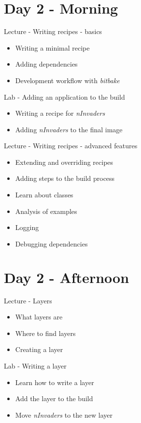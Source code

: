 \documentclass[a4paper,12pt,obeyspaces,spaces,hyphens]{article}
\begin{document}
\section{Day 2 - Morning}

\feagendatwocolumn
{Lecture - Writing recipes - basics}
{
  \begin{itemize}
  \item Writing a minimal recipe
  \item Adding dependencies
  \item Development workflow with {\em bitbake}
  \end{itemize}
}
{Lab - Adding an application to the build}
{
  \begin{itemize}
  \item Writing a recipe for {\em nInvaders}
  \item Adding {\em nInvaders} to the final image
  \end{itemize}
}

\feagendaonecolumn
{Lecture - Writing recipes - advanced features}
{
  \begin{itemize}
  \item Extending and overriding recipes
  \item Adding steps to the build process
  \item Learn about classes
  \item Analysis of examples
  \item Logging
  \item Debugging dependencies
  \end{itemize}
}

\section{Day 2 - Afternoon}

\feagendatwocolumn
{Lecture - Layers}
{
  \begin{itemize}
  \item What layers are
  \item Where to find layers
  \item Creating a layer
  \end{itemize}
}
{Lab - Writing a layer}
{
  \begin{itemize}
  \item Learn how to write a layer
  \item Add the layer to the build
  \item Move {\em nInvaders} to the new layer
  \end{itemize}
}
\end{document}
